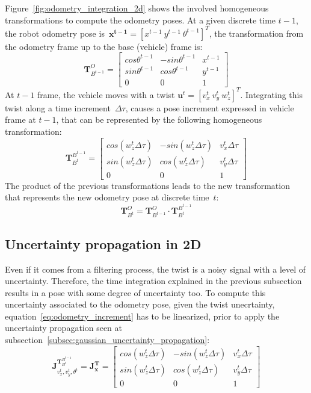 Figure~\ref{fig:odometry_integration_2d} shows the involved homogeneous transformations to compute the odometry poses. At a given discrete time $t-1$, the robot odometry pose is~$\mathbf{x^{t-1}}=[x^{t-1}\ y^{t-1}\ \theta^{t-1}]^T$, the transformation from the odometry frame up to the base (vehicle) frame is: 
\begin{equation}
 \mathbf{T}^O_{B^{t-1}} = 
 \left[
 \begin{array}{ccc}
  cos\theta^{t-1} & -sin\theta^{t-1} & x^{t-1} \\
  sin\theta^{t-1} &  cos\theta^{t-1} & y^{t-1} \\
  0 & 0 & 1
 \end{array}
 \right]
\end{equation}
At $t-1$ frame, the vehicle moves with a twist $\mathbf{u}^t=[v^t_x\ v^t_y\ w^t_z]^T$. Integrating this twist along a time increment~$\Delta\tau$, causes a pose increment expressed in vehicle frame at $t-1$, that can be represented by the following homogeneous transformation: 
\begin{equation}
 \mathbf{T}^{B^{t-1}}_{B^t} = 
 \left[
 \begin{array}{ccc}
  cos(w_z^t\Delta\tau) & -sin(w_z^t\Delta\tau) & v_x^t\Delta\tau\\
  sin(w_z^t\Delta\tau) &  cos(w_z^t\Delta\tau) & v_y^t\Delta\tau \\
  0 & 0 & 1
 \end{array}
 \right]
 \label{eq:odometry_increment}
\end{equation}
The product of the previous transformations leads to the new transformation that represents the new odometry pose at discrete time~$t$: 
\begin{equation}
\mathbf{T}^O_{B^t} = \mathbf{T}^O_{B^{t-1}} \cdot \mathbf{T}^{B^{t-1}}_{B^t}
\end{equation}


\subsection{Uncertainty propagation in 2D}
Even if it comes from a filtering process, the twist is a noisy signal with a level of uncertainty. Therefore, the time integration explained in the previous subsection results in a pose with some degree of uncertainty too. To compute this uncertainty associated to the  odometry pose, given the twist unecrtainty, equation~\ref{eq:odometry_increment} has to be linearized, prior to apply the uncertainty propagation seen at subsection~\ref{subsec:gaussian_uncertainty_propagation}: 
\begin{equation}
\mathbf{J}^{\mathbf{T}^{B^{t-1}}_{B^t} }_{v^t_x, v^t_y, \theta^t}= 
\mathbf{J}^{\mathbf{T}}_{\mathbf{x}} = 
 \left[
 \begin{array}{ccc}
  cos(w_z^t\Delta\tau) & -sin(w_z^t\Delta\tau) & v_x^t\Delta\tau\\
  sin(w_z^t\Delta\tau) &  cos(w_z^t\Delta\tau) & v_y^t\Delta\tau \\
  0 & 0 & 1
 \end{array}
 \right]
 \label{eq:odometry_increment}
\end{equation}

